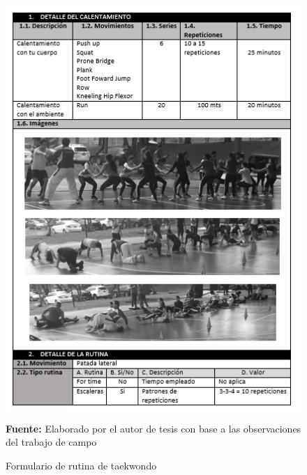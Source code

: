 \begin{figure}[H]
	\caption{Formulario de rutina de taekwondo}
	\label{fig:frmRoutTaek}
	\centering	\includegraphics[width=445px,height=600px]{graphics/resultados/rutina-taekwondo.PNG} \\
	\textbf{Fuente:} Elaborado por el autor de tesis con base a las observaciones del trabajo de campo
\end{figure}
